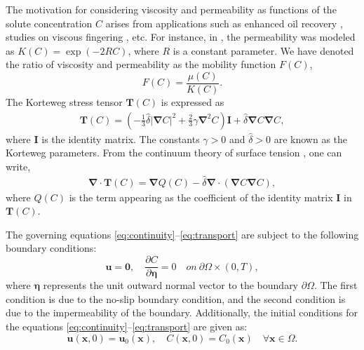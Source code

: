 \documentclass[final,3p,times]{elsarticle}
\theoremstyle{plain}
\theoremstyle{remark}
\theoremstyle{plain}
\theoremstyle{remark}
\begin{document}
The motivation for considering viscosity and permeability as functions of the solute concentration \( C \) arises from applications such as enhanced oil recovery \cite{homsy1987viscous}, studies on viscous fingering \cite{nagatsu2014hydrodynamic, rana2019influence}, etc.
 For instance, in \cite{nagatsu2014hydrodynamic}, the permeability was modeled as \( K(C) = \exp(-2RC) \), where \( R \) is a constant parameter. We have denoted the ratio of viscosity and permeability as the mobility function $F(C)$, 
 \begin{equation}
     \label{eq:F}
     F\left(C\right)= \displaystyle \frac{\mu \left(C\right)}{K\left(C\right)}.
 \end{equation}
The Korteweg stress tensor \( \mathbf{T}(C) \) is expressed as \citet[see][and references therein]{pramanik2013linear}
\begin{align}\label{exp: Korteweg 1st}
\mathbf{T}(C) = \left( -\frac{1}{3} \hat{\delta} |\boldsymbol{\nabla} C|^{2} + \frac{2}{3} \gamma \boldsymbol{\nabla}^{2} C \right) \mathbf I + \hat{\delta} \boldsymbol{\nabla} C \boldsymbol{\nabla} C,
\end{align}
where \( \mathbf I \) is the identity matrix. The constants \( \gamma > 0 \) and \( \hat{\delta} > 0 \) are known as the Korteweg parameters. From the continuum theory of surface tension \cite{JOSEPH1996104}, one can write,
\begin{align} \label{exp: Korteweg stress}
\boldsymbol{\nabla} \cdot \mathbf{T}(C) = \boldsymbol{\nabla} Q(C) - \hat{\delta} \boldsymbol{\nabla} \cdot \left( \boldsymbol{\nabla} C  \boldsymbol{\nabla} C \right),
\end{align}
where \( Q(C) \) is the term appearing as the coefficient of the identity matrix \( \mathbf I \) in \( \mathbf{T}(C) \).
 
The governing equations \eqref{eq:continuity}--\eqref{eq:transport} are subject to the following boundary conditions:
\begin{equation}
	\mathbf{u} = \mathbf 0, \quad \frac{\partial C}{\partial \boldsymbol{\eta}} = 0 \quad on \ \partial \Omega \times \left(0,T\right) \label{eq: boundary condition},
\end{equation}
where $\boldsymbol{\eta}$ represents the unit outward normal vector to the boundary \(\partial \Omega\).
The first condition is due to the no-slip boundary condition, and the second condition is due to the impermeability of the boundary.
Additionally, the initial conditions for the equations \eqref{eq:continuity}--\eqref{eq:transport} are given as:
\begin{equation}
	\mathbf{u}\left(\mathbf{x}, 0\right) = \mathbf{u}_0\left(\mathbf{x}\right), \quad C\left(\mathbf{x}, 0\right) = C_0\left(\mathbf{x}\right) \quad \forall \mathbf{x} \in \Omega \label{eq:initial_condition}.
\end{equation}
\end{document}
